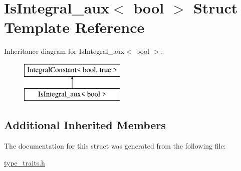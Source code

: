 \hypertarget{struct_is_integral__aux_3_01bool_01_4}{}\section{Is\+Integral\+\_\+aux$<$ bool $>$ Struct Template Reference}
\label{struct_is_integral__aux_3_01bool_01_4}
Inheritance diagram for Is\+Integral\+\_\+aux$<$ bool $>$\+:\begin{figure}[H]
\begin{center}
\leavevmode
\includegraphics[height=2.000000cm]{struct_is_integral__aux_3_01bool_01_4}
\end{center}
\end{figure}
\subsection*{Additional Inherited Members}


The documentation for this struct was generated from the following file\+:\begin{DoxyCompactItemize}
\item 
\hyperlink{type__traits_8h}{type\+\_\+traits.\+h}\end{DoxyCompactItemize}
